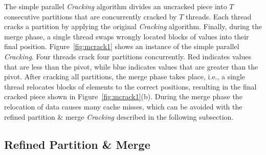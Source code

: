 The simple parallel \emph{Cracking} algorithm divides an
uncracked piece into $T$ consecutive partitions that are
concurrently cracked by $T$ threads.  Each thread cracks a partition by
applying the original \emph{Cracking} algorithm.  Finally, during the merge phase, a single thread swaps
wrongly located blocks of values into their final position.
Figure~\ref{fig:mcrack1} shows an instance of the simple parallel
\emph{Cracking}.  Four threads crack four partitions concurrently.
Red indicates values that are less than the pivot, while
blue indicates values that are greater than the pivot.  
After cracking all partitions, the merge phase takes place, i.e., a single thread relocates blocks of elements to the correct positions, resulting in the final cracked piece shown in Figure~\ref{fig:mcrack1}(b).
During the merge phase the relocation of data causes many cache misses, which can be avoided with the refined partition \& merge \emph{Cracking} described in the following subsection.

\subsection*{Refined Partition \& Merge}
\label{subsubsec:refined-partition-merge}

